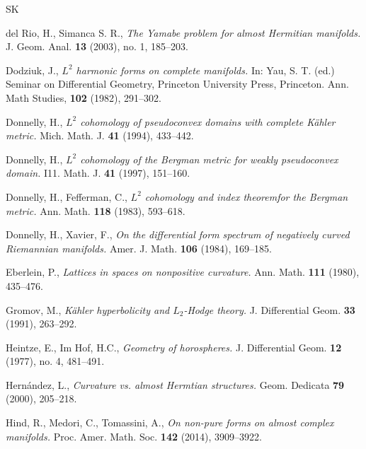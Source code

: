 \documentclass[12pt, twoside]{article}
\theoremstyle{definition}
\numberwithin{equation}{section}
\begin{document}
\begin{thebibliography}{SK}
			
		del Rio, H., Simanca S. R.,
		\textit{The Yamabe problem for almost Hermitian manifolds.}
		J. Geom. Anal. \textbf{13} (2003), no. 1, 185--203. 
			
		
		
		Dodziuk, J.,
		\textit{$L^{2}$ harmonic forms on complete manifolds.}
		In: Yau, S. T. (ed.) Seminar on Differential Geometry, Princeton University Press, Princeton. Ann. Math Studies, \textbf{102} (1982), 291--302.
		
		Donnelly, H.,
		\textit{$L^{2}$ cohomology of pseudoconvex domains with complete K\"{a}hler metric.}
		Mich. Math. J. \textbf{41} (1994), 433--442.
		
		Donnelly, H.,
		\textit{$L^{2}$ cohomology of the Bergman metric for weakly pseudoconvex domain.}
		I11. Math. J. \textbf{41} (1997), 151--160.
		
		Donnelly, H., Fefferman, C.,
		\textit{$L^{2}$ cohomology and index theoremfor the Bergman metric.}
		Ann. Math. \textbf{118} (1983), 593--618.
		
	Donnelly, H., Xavier, F.,
	\textit{On the differential form spectrum of negatively curved Riemannian manifolds.}
	Amer. J. Math. \textbf{106} (1984),  169--185.
		
		Eberlein, P.,
		\textit{Lattices in spaces on nonpositive curvature.}
		Ann. Math. \textbf{111} (1980), 435--476.
			
		Gromov, M.,
		\textit{K\"{a}hler hyperbolicity and $L_{2}$-Hodge theory.}
		J. Differential Geom. \textbf{33} (1991), 263--292.
		
	
		Heintze, E., Im Hof, H.C.,
		\textit{Geometry of horospheres.}
		J. Differential Geom. \textbf{12} (1977), no. 4, 481--491.
		
		
		Hern\'{a}ndez, L.,
		\textit{Curvature vs. almost Hermtian structures.}
		Geom. Dedicata \textbf{79} (2000), 205--218.
		
		Hind, R., Medori, C., Tomassini, A.,
		\textit{On non-pure forms on almost complex manifolds.}
		Proc. Amer. Math. Soc. \textbf{142} (2014), 3909--3922.
		

\end{thebibliography}
\end{document}
